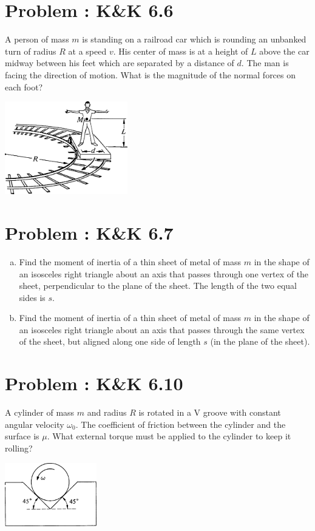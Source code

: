 \documentclass[problems]{esg8012pset}
\begin{document}
\section{Problem \thesection: K\&K 6.6}
  A person of mass $m$ is standing on a railroad car which is rounding an unbanked turn of radius $R$ at a speed $v$. His center of mass is at a height of $L$ above the car midway between his feet which are separated by a distance of $d$. The man is facing the direction of motion. What is the magnitude of the normal forces on each foot?
  \begin{center}\includegraphics[width=0.4\textwidth]{ps08_3}\end{center}
\section{Problem \thesection: K\&K 6.7}
  \begin{enumerate}[(a)]
    \item Find the moment of inertia of a thin sheet of metal of mass $m$ in the shape of an isosceles right triangle about an axis that passes through one vertex of the sheet, perpendicular to the plane of the sheet. The length of the two equal sides is $s$.
    \item Find the moment of inertia of a thin sheet of metal of mass $m$ in the shape of an isosceles right triangle about an axis that passes through the same vertex of the sheet, but aligned along one side of length $s$ (in the plane of the sheet).
  \end{enumerate}
\section{Problem \thesection: K\&K 6.10}
  A cylinder of mass $m$ and radius $R$ is rotated in a V groove with constant angular velocity $\omega_{0}$.
The coefficient of friction between the cylinder and the surface is $\mu$. What external torque must be applied to the cylinder to keep it rolling?
  \begin{center}\includegraphics[width=0.3\textwidth]{ps08_4}\end{center}
\end{document}

